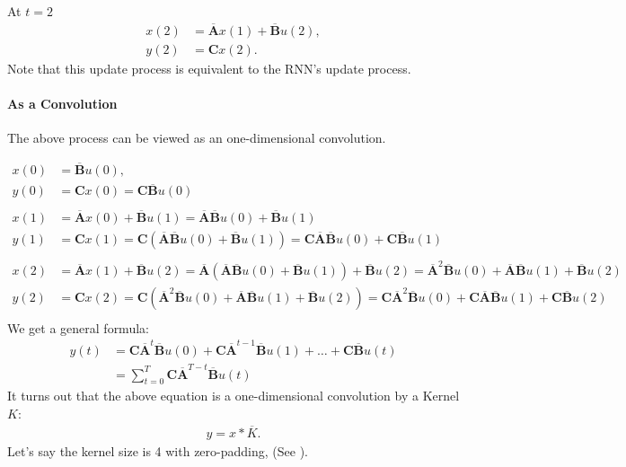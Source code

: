 At $t=2$
\begin{align*}
	x(2) &= \overline{\mathbf{A}}x(1)+\overline{\mathbf{B}}u(2),\\
	y(2) &= \mathbf{C}x(2).
\end{align*}
Note that this update process is equivalent to the RNN's update process. 

\paragraph{As a Convolution} 
The above process can be viewed as an one-dimensional convolution. 

\begin{align*}
	x(0) &= \overline{\mathbf{B}}u(0),\\
	y(0) &= \mathbf{C}x(0) = \mathbf{C}\overline{\mathbf{B}}u(0)\\
		 &\\
	x(1) &= \overline{\mathbf{A}}x(0)+\overline{\mathbf{B}}u(1)=\overline{\mathbf{A}}\overline{\mathbf{B}}u(0)+\overline{\mathbf{B}}u(1)\\
	y(1) &= \mathbf{C}x(1) = \mathbf{C}(\overline{\mathbf{A}}\overline{\mathbf{B}}u(0)+\overline{\mathbf{B}}u(1)) = \mathbf{C}\overline{\mathbf{A}}\overline{\mathbf{B}}u(0)+\mathbf{C}\overline{\mathbf{B}}u(1)\\
		 &\\
	x(2) &= \overline{\mathbf{A}}x(1)+\overline{\mathbf{B}}u(2)=\overline{\mathbf{A}}(\overline{\mathbf{A}}\overline{\mathbf{B}}u(0)+\overline{\mathbf{B}}u(1))+\overline{\mathbf{B}}u(2)=\overline{\mathbf{A}}^2\overline{\mathbf{B}}u(0)+\overline{\mathbf{A}}\overline{\mathbf{B}}u(1)+\overline{\mathbf{B}}u(2)\\
	y(2) &= \mathbf{C}x(2)=\mathbf{C}(\overline{\mathbf{A}}^2\overline{\mathbf{B}}u(0)+\overline{\mathbf{A}}\overline{\mathbf{B}}u(1)+\overline{\mathbf{B}}u(2))=\mathbf{C}\overline{\mathbf{A}}^2\overline{\mathbf{B}}u(0)+\mathbf{C}\overline{\mathbf{A}}\overline{\mathbf{B}}u(1)+\mathbf{C}\overline{\mathbf{B}}u(2)\\
\end{align*}
We get a general formula:
\begin{align*}
	y(t) &= \mathbf{C}\overline{\mathbf{A}}^t\overline{\mathbf{B}}u(0)+\mathbf{C}\overline{\mathbf{A}}^{t-1}\overline{\mathbf{B}}u(1)+\dots+\mathbf{C}\overline{\mathbf{B}}u(t)\\
		 &= \sum_{t=0}^T \mathbf{C}\overline{\mathbf{A}}^{T-t}\overline{\mathbf{B}}u(t)
\end{align*}
It turns out that the above equation is a one-dimensional convolution by a Kernel $K$:
\begin{align*}
	y = x*\overline{K}.
\end{align*}
Let's say the kernel size is 4 with zero-padding,  (See ).

